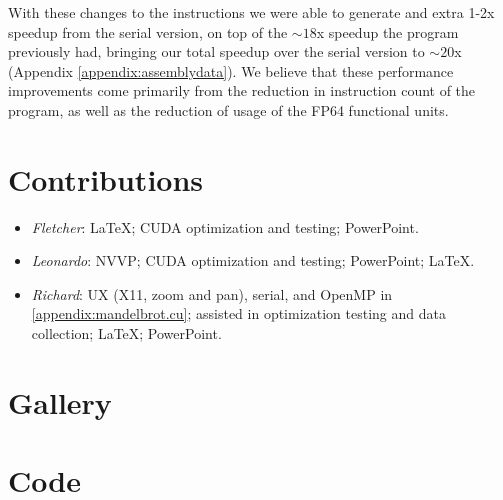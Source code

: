 \documentclass{article}
\begin{document}
    With these changes to the instructions we were able to generate and extra 1-2x speedup from the serial version, on top of the ${\sim}18$x speedup the program previously had, bringing our total speedup over the serial version to ${\sim}20$x (Appendix \ref{appendix:assemblydata}). We believe that these performance improvements come primarily from the reduction in instruction count of the program, as well as the reduction of usage of the FP64 functional units.

\pagebreak    
\appendix
    \section{Contributions}
        \begin{itemize}
        	\item \emph{Fletcher}: \LaTeX{}; CUDA optimization and testing; PowerPoint.

        	\item \emph{Leonardo}: NVVP; CUDA optimization and testing; PowerPoint; \LaTeX{}.

        	\item \emph{Richard}: UX (X11, zoom and pan), serial, and OpenMP in \ref{appendix:mandelbrot.cu}; assisted in optimization testing and data collection; \LaTeX{}; PowerPoint.
        \end{itemize}

    \newcommand{\centeredimage}[2]{
        \vspace*{\fill}%
        \noindent%
        \makebox[\textwidth]{\texttt{[image: \#2]}}%
        \vspace*{2cm}%
    }

    \pagebreak
    \section{Gallery}
        \centeredimage{width=0.75\paperwidth}{gallery/Image2.png}
        \clearpage
        \centeredimage{width=0.75\paperwidth}{gallery/Image3.png}
        \clearpage
        \centeredimage{width=0.75\paperwidth}{gallery/Image4.png}
        \clearpage
        \centeredimage{width=0.75\paperwidth}{gallery/Image5.png}
        \clearpage
        \centeredimage{width=0.75\paperwidth}{gallery/Image6.png}
        \clearpage

    \section{Code}
        \lstset{language=C,stringstyle=\ttfamily, showstringspaces=false, numbers=left, frame=single, framexrightmargin=0pt, columns=fullflexible, breaklines=true, breakatwhitespace=true}
\end{document}
